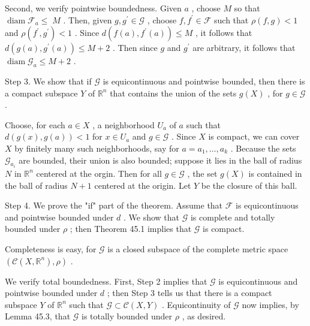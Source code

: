 \documentclass[10pt]{article}
\begin{document}
Second, we verify pointwise boundedness. Given \(a\) , choose \(M\) so that \(\operatorname{diam}{\mathcal{F}}_{a} \leq \; M\) . Then, given \(g,{g}^{\prime } \in  \mathcal{G}\) , choose \(f,{f}^{\prime } \in  \mathcal{F}\) such that \(\rho \left( {f,g}\right)  < 1\) and \(\rho \left( {{f}^{\prime },{g}^{\prime }}\right)  < 1\) . Since \(d\left( {f\left( a\right) ,{f}^{\prime }\left( a\right) }\right)  \leq  M\) , it follows that \(d\left( {g\left( a\right) ,{g}^{\prime }\left( a\right) }\right)  \leq  M + 2\) . Then since \(g\) and \({g}^{\prime }\) are arbitrary, it follows that \(\operatorname{diam}{\mathcal{G}}_{a} \leq  M + 2\) .

Step 3. We show that if \(\mathcal{G}\) is equicontinuous and pointwise bounded, then there is a compact subspace \(Y\) of \({\mathbb{R}}^{n}\) that contains the union of the sets \(g\left( X\right)\) , for \(g \in  \mathcal{G}\) .

Choose, for each \(a \in  X\) , a neighborhood \({U}_{a}\) of \(a\) such that \(d\left( {g\left( x\right) ,g\left( a\right) }\right)  < 1\) for \(x \in  {U}_{a}\) and \(g \in  \mathcal{G}\) . Since \(X\) is compact, we can cover \(X\) by finitely many such neighborhoods, say for \(a = {a}_{1},\ldots ,{a}_{k}\) . Because the sets \({\mathcal{G}}_{{a}_{i}}\) are bounded, their union is also bounded; suppose it lies in the ball of radius \(N\) in \({\mathbb{R}}^{n}\) centered at the orgin. Then for all \(g \in  \mathcal{G}\) , the set \(g\left( X\right)\) is contained in the ball of radius \(N + 1\) centered at the origin. Let \(Y\) be the closure of this ball.

Step 4. We prove the "if" part of the theorem. Assume that \(\mathcal{F}\) is equicontinuous and pointwise bounded under \(d\) . We show that \(\mathcal{G}\) is complete and totally bounded under \(\rho\) ; then Theorem 45.1 implies that \(\mathcal{G}\) is compact.

Completeness is easy, for \(\mathcal{G}\) is a closed subspace of the complete metric space \(\left( {\mathcal{C}\left( {X,{\mathbb{R}}^{n}}\right) ,\rho }\right)\) .

We verify total boundedness. First, Step 2 implies that \(\mathcal{G}\) is equicontinuous and pointwise bounded under \(d\) ; then Step 3 tells us that there is a compact subspace \(Y\) of \({\mathbb{R}}^{n}\) such that \(\mathcal{G} \subset  \mathcal{C}\left( {X,Y}\right)\) . Equicontinuity of \(\mathcal{G}\) now implies, by Lemma 45.3, that \(\mathcal{G}\) is totally bounded under \(\rho\) , as desired.
\end{document}
